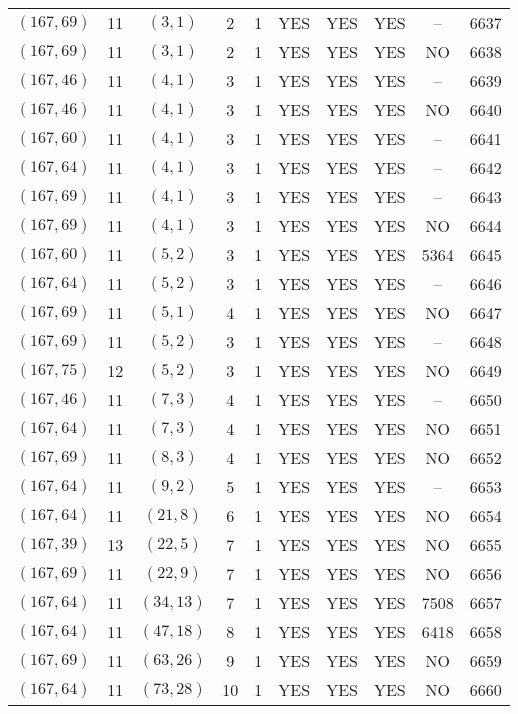 \begin{longtable}{|c|c|c|c|c|c|c|c|c|c|}
$(167, 69)$ & 11 & $(3, 1)$ & 2 & 1 & YES & YES & YES & -- & 6637\\
$(167, 69)$ & 11 & $(3, 1)$ & 2 & 1 & YES & YES & YES & NO & 6638\\
$(167, 46)$ & 11 & $(4, 1)$ & 3 & 1 & YES & YES & YES & -- & 6639\\
$(167, 46)$ & 11 & $(4, 1)$ & 3 & 1 & YES & YES & YES & NO & 6640\\
$(167, 60)$ & 11 & $(4, 1)$ & 3 & 1 & YES & YES & YES & -- & 6641\\
$(167, 64)$ & 11 & $(4, 1)$ & 3 & 1 & YES & YES & YES & -- & 6642\\
$(167, 69)$ & 11 & $(4, 1)$ & 3 & 1 & YES & YES & YES & -- & 6643\\
$(167, 69)$ & 11 & $(4, 1)$ & 3 & 1 & YES & YES & YES & NO & 6644\\
$(167, 60)$ & 11 & $(5, 2)$ & 3 & 1 & YES & YES & YES & 5364 & 6645\\
$(167, 64)$ & 11 & $(5, 2)$ & 3 & 1 & YES & YES & YES & -- & 6646\\
$(167, 69)$ & 11 & $(5, 1)$ & 4 & 1 & YES & YES & YES & NO & 6647\\
$(167, 69)$ & 11 & $(5, 2)$ & 3 & 1 & YES & YES & YES & -- & 6648\\
$(167, 75)$ & 12 & $(5, 2)$ & 3 & 1 & YES & YES & YES & NO & 6649\\
$(167, 46)$ & 11 & $(7, 3)$ & 4 & 1 & YES & YES & YES & -- & 6650\\
$(167, 64)$ & 11 & $(7, 3)$ & 4 & 1 & YES & YES & YES & NO & 6651\\
$(167, 69)$ & 11 & $(8, 3)$ & 4 & 1 & YES & YES & YES & NO & 6652\\
$(167, 64)$ & 11 & $(9, 2)$ & 5 & 1 & YES & YES & YES & -- & 6653\\
$(167, 64)$ & 11 & $(21, 8)$ & 6 & 1 & YES & YES & YES & NO & 6654\\
$(167, 39)$ & 13 & $(22, 5)$ & 7 & 1 & YES & YES & YES & NO & 6655\\
$(167, 69)$ & 11 & $(22, 9)$ & 7 & 1 & YES & YES & YES & NO & 6656\\
$(167, 64)$ & 11 & $(34, 13)$ & 7 & 1 & YES & YES & YES & 7508 & 6657\\
$(167, 64)$ & 11 & $(47, 18)$ & 8 & 1 & YES & YES & YES & 6418 & 6658\\
$(167, 69)$ & 11 & $(63, 26)$ & 9 & 1 & YES & YES & YES & NO & 6659\\
$(167, 64)$ & 11 & $(73, 28)$ & 10 & 1 & YES & YES & YES & NO & 6660\\

\end{longtable}

